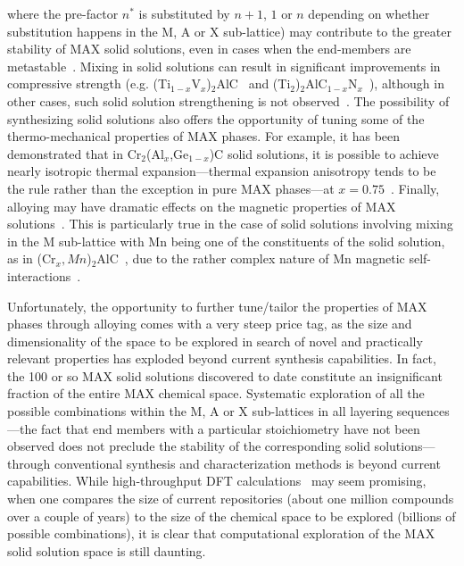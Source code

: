 \documentclass[preprint,amsmath,amssymb,aps, prb,showkeys]{revtex4-1}
\begin{document}
\noindent where the pre-factor $n^*$ is substituted by $n+1$, $1$ or $n$ depending on whether substitution happens in the M, A or X sub-lattice) may contribute to the greater stability of MAX solid solutions, even in cases when the end-members are metastable~\cite{zhou2008new}. Mixing in solid solutions can result in significant improvements in compressive strength (e.g. (Ti$_{1-x}$V$_x$)$_2$AlC~\cite{meng2005strengthening} and (Ti$_{2}$)$_2$AlC$_{1-x}$N$_x$~\cite{barsoum2000processing}), although in other cases, such solid solution strengthening is not observed~\cite{salama2002synthesis,ganguly2004synthesis}. The possibility of synthesizing solid solutions also offers the opportunity of tuning some of the thermo-mechanical properties of MAX phases. For example, it has been demonstrated that in Cr$_2$(Al$_{x}$,Ge$_{1-x}$)C solid solutions, it is possible to achieve nearly isotropic thermal expansion---thermal expansion anisotropy tends to be the rule rather than the exception in pure MAX phases---at $x=0.75$~\cite{cabioch2013tailoring}. Finally, alloying may have dramatic effects on the magnetic 
properties of MAX solutions~\cite{mockute2013synthesis}. This is particularly true in the case of solid solutions involving mixing in the M sub-lattice with Mn being one of the constituents of the solid solution, as in (Cr$_{x},Mn$)$_2$AlC~\cite{dahlqvist2011magnetic}, due to the rather complex nature of Mn magnetic self-interactions~\cite{sandratskii2002exchange,larson1988theory}. 

Unfortunately, the opportunity to further tune/tailor the properties of MAX phases through alloying comes with a very steep price tag, as the size and dimensionality of the space to be explored in search of novel and practically relevant properties has exploded beyond current synthesis capabilities. In fact, the 100 or so MAX solid solutions discovered to date constitute an insignificant fraction of the entire MAX chemical space. Systematic exploration of all the possible combinations within the M, A or X sub-lattices in all layering sequences---the fact that end members with a particular stoichiometry have not been observed does not preclude the stability of the corresponding solid solutions---through conventional synthesis and characterization methods is beyond current capabilities. While high-throughput DFT calculations~\cite{saal2013materials,curtarolo2012aflowlib} may seem promising, when one compares the size of current repositories (about one million compounds over a couple of years) to the size of the chemical space to be explored (billions of possible combinations), it is clear that computational exploration of the MAX solid solution space is still daunting.   
\end{document}
